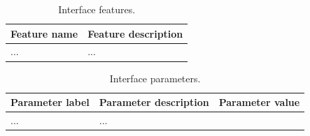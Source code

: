 \clearpage

\clearpage


\begin{table}[ht]
\caption{Interface features.} \label{tab:interface_features}
\begin{tabular}{l | p{13cm}}
	\toprule
	Feature name & Feature description \\
	\midrule
	... & ... \\
	\bottomrule
\end{tabular}
\end{table}


\begin{table}[ht]
\caption{Interface parameters.} \label{tab:interface_parameters}
\begin{tabular}{l | l | l}
	\toprule
	Parameter label & Parameter description & Parameter value \\
	\midrule
	... & ... \\
	\bottomrule
\end{tabular}
\end{table}
